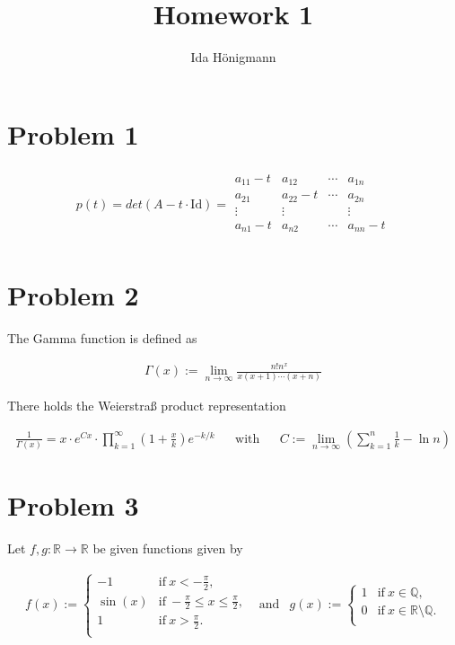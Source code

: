 \documentclass[]{article}
\title{Homework 1}
\author{Ida Hönigmann}
\begin{document}
\maketitle

\section*{Problem 1}

\begin{align*}
	p(t)=det(A-t \cdot \textrm{Id}) =
	\begin{array}{|cccc|}
		a_{11}-t & a_{12} & \cdots & a_{1n} \\
		a_{21} & a_{22} - t & \cdots & a_{2n} \\
		\vdots & \vdots & & \vdots \\
		a_{n1}-t & a_{n2} & \cdots & a_{nn} - t \\
	\end{array}
\end{align*}


\section*{Problem 2}

The Gamma function is defined as

\begin{align*}
	\Gamma (x) := \lim\limits_{n \to \infty} \frac{n! n^x}{x(x+1)\cdots (x+n)}
\end{align*}

\noindent
There holds the Weierstraß product representation

\begin{align*}
	\frac{1}{\Gamma (x)} = x \cdot e^{Cx} \cdot \prod_{k=1}^{\infty} (1 + \frac{x}{k}) e^{-k/k} && \textrm{with} && C := \lim\limits_{n \to \infty} (\sum_{k=1}^{n} \frac{1}{k} - \ln n)
\end{align*}


\section*{Problem 3}

Let $f,g : \mathbb{R} \to \mathbb{R}$ be given functions given by

\begin{align*}
	f(x) := \left\{
	\begin{array}{ll}
		-1 & \textrm{if}\ x < - \frac{\pi}{2}, \\
		\sin (x) & \textrm{if}\ - \frac{\pi}{2} \leq x \leq \frac{\pi}{2}, \\
		1 & \textrm{if}\ x > \frac{\pi}{2}. \\
	\end{array}
	\right. & \textrm{and} & 
	g(x) := \left\{
	\begin{array}{ll}
		1 & \textrm{if}\ x \in \mathbb{Q}, \\
		0 & \textrm{if}\ x \in \mathbb{R} \setminus \mathbb{Q}. \\
	\end{array}
	\right.
\end{align*}
\end{document}
